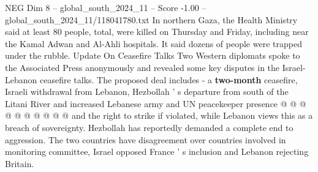 \begin{textsample}{NEG Dim 8 – global\_south\_2024\_11 – Score -1.00 – global\_south\_2024\_11/118041780.txt}
In northern Gaza, the Health Ministry said at least 80 people, total, were killed on Thursday and Friday, including near the Kamal Adwan and Al-Ahli hospitals.
It said dozens of people were trapped under the rubble.
Update On Ceasefire Talks Two Western diplomats spoke to the Associated Press anonymously and revealed some key disputes in the Israel-Lebanon ceasefire talks.
The proposed deal includes - a \textbf{two-month} ceasefire, Israeli withdrawal from Lebanon, Hezbollah ' s departure from south of the Litani River and increased Lebanese army and UN peacekeeper presence @ @ @ @ @ @ @ @ @ @ and the right to strike if violated, while Lebanon views this as a breach of sovereignty.
Hezbollah has reportedly demanded a complete end to aggression.
The two countries have disagreement over countries involved in monitoring committee, Israel opposed France ' s inclusion and Lebanon rejecting Britain.

\end{textsample}
